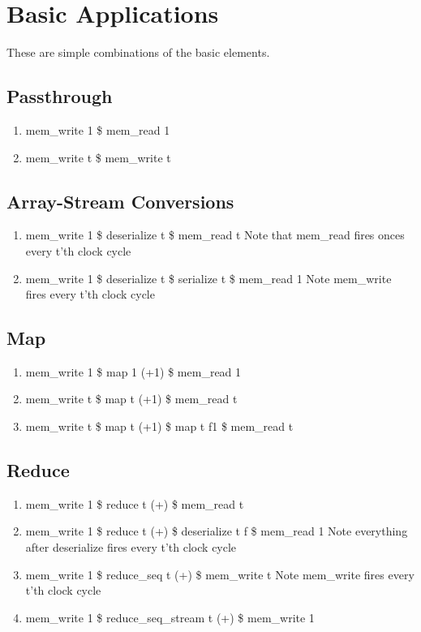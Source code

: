 \documentclass[11pt,fleqn]{article}
\numberwithin{equation}{subsection}
\begin{document}
\section{Basic Applications}
These are simple combinations of the basic elements.

\subsection{Passthrough}
\begin{enumerate}
    \item mem\_write 1 \$ mem\_read 1
    \item mem\_write t \$ mem\_write t 
\end{enumerate}

\subsection{Array-Stream Conversions}
\begin{enumerate}
    \item mem\_write 1 \$ deserialize t \$ mem\_read t
        \subitem Note that mem\_read fires onces every t'th clock cycle
    \item mem\_write 1 \$ deserialize t \$ serialize t \$ mem\_read 1
        \subitem Note mem\_write fires every t'th clock cycle
\end{enumerate}

\subsection{Map}
\begin{enumerate}
    \item mem\_write 1 \$ map 1 (+1) \$ mem\_read 1
    \item mem\_write t \$ map t (+1) \$ mem\_read t
    \item mem\_write t \$ map t (+1) \$ map t f1 \$ mem\_read t
\end{enumerate}

\subsection{Reduce}
\begin{enumerate}
    \item mem\_write 1 \$ reduce t (+) \$ mem\_read t
    \item mem\_write 1 \$ reduce t (+) \$ deserialize t f \$ mem\_read 1 
        \subitem Note everything after deserialize fires every t'th clock cycle
    \item mem\_write 1 \$ reduce\_seq t (+) \$ mem\_write t
        \subitem Note mem\_write fires every t'th clock cycle
    \item mem\_write 1 \$ reduce\_seq\_stream t (+) \$ mem\_write 1
\end{enumerate}
\end{document}
